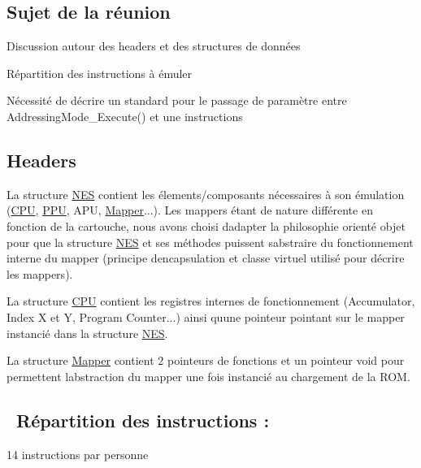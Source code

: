 \subsection*{Sujet de la réunion}


\begin{DoxyItemize}
\item Discussion autour des headers et des structures de données
\item Répartition des instructions à émuler
\item Nécessité de décrire un standard pour le passage de paramètre entre Addressing\+Mode\+\_\+\+Execute() et une instructions
\end{DoxyItemize}

\subsection*{Headers}

La structure \hyperlink{struct_n_e_s}{N\+ES} contient les élements/composants nécessaires à son émulation (\hyperlink{struct_c_p_u}{C\+PU}, \hyperlink{struct_p_p_u}{P\+PU}, A\+PU, \hyperlink{struct_mapper}{Mapper}...). Les mappers étant de nature différente en fonction de la cartouche, nous avons choisi d\textquotesingle{}adapter la philosophie orienté objet pour que la structure \hyperlink{struct_n_e_s}{N\+ES} et ses méthodes puissent s\textquotesingle{}abstraire du fonctionnement interne du mapper (principe d\textquotesingle{}encapsulation et classe virtuel utilisé pour décrire les mappers).

La structure \hyperlink{struct_c_p_u}{C\+PU} contient les registres internes de fonctionnement (Accumulator, Index X et Y, Program Counter...) ainsi qu\textquotesingle{}une pointeur pointant sur le mapper instancié dans la structure \hyperlink{struct_n_e_s}{N\+ES}.

La structure \hyperlink{struct_mapper}{Mapper} contient 2 pointeurs de fonctions et un pointeur void pour permettent l\textquotesingle{}abstraction du mapper une fois instancié au chargement de la R\+OM.

\subsection*{ \+Répartition des instructions \+:}


\begin{DoxyItemize}
\item 14 instructions par personne
\end{DoxyItemize}

